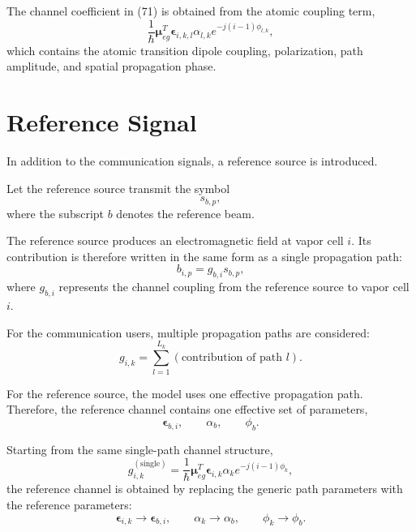 \documentclass[12pt,a4paper]{article}
\begin{document}
The channel coefficient in (71) is obtained from the atomic coupling
term,
\begin{equation}
\frac{1}{\hbar}
\boldsymbol{\mu}_{eg}^{T}
\boldsymbol{\epsilon}_{i,k,l}
\alpha_{l,k}
e^{-j(i-1)\phi_{l,k}},
\tag{77}
\end{equation}
which contains the atomic transition dipole coupling, polarization,
path amplitude, and spatial propagation phase.

\section{Reference Signal}

In addition to the communication signals, a reference source is
introduced.

Let the reference source transmit the symbol
\begin{equation}
s_{b,p},
\tag{78}
\end{equation}
where the subscript $b$ denotes the reference beam.

The reference source produces an electromagnetic field at vapor cell
$i$. Its contribution is therefore written in the same form as a
single propagation path:
\begin{equation}
b_{i,p}
=
g_{b,i}s_{b,p},
\tag{79}
\end{equation}
where $g_{b,i}$ represents the channel coupling from the reference
source to vapor cell $i$.

For the communication users, multiple propagation paths are
considered:
\begin{equation}
g_{i,k}
=
\sum_{l=1}^{L_k}
\left(
\text{contribution of path }l
\right).
\tag{80}
\end{equation}

For the reference source, the model uses one effective propagation
path. Therefore, the reference channel contains one effective set of
parameters,
\begin{equation}
\boldsymbol{\epsilon}_{b,i},
\qquad
\alpha_b,
\qquad
\phi_b.
\tag{81}
\end{equation}

Starting from the same single-path channel structure,
\begin{equation}
g_{i,k}^{(\mathrm{single})}
=
\frac{1}{\hbar}
\boldsymbol{\mu}_{eg}^{T}
\boldsymbol{\epsilon}_{i,k}
\alpha_k
e^{-j(i-1)\phi_k},
\tag{82}
\end{equation}
the reference channel is obtained by replacing the generic path
parameters with the reference parameters:
\begin{equation}
\boldsymbol{\epsilon}_{i,k}
\rightarrow
\boldsymbol{\epsilon}_{b,i},
\qquad
\alpha_k
\rightarrow
\alpha_b,
\qquad
\phi_k
\rightarrow
\phi_b.
\tag{83}
\end{equation}
\end{document}
